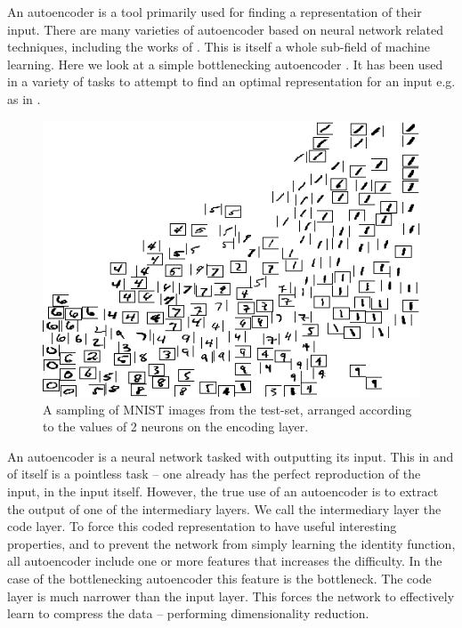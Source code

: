 \documentclass[12pt,parskip]{komatufte}
\begin{document}
An autoencoder is a tool primarily used for finding a representation of their input.
There are many varieties of autoencoder based on neural network related techniques, including the works of \textcite{hinton2002RBM,hinton2006reducing,hinton2006fastDBN,vincent2010stacked,ICML2012Chen_416,2014VAE}.
This is itself a whole sub-field of machine learning.
Here we look at a simple bottlenecking autoencoder
\parencite{bourlard1988auto,japkowicz2000nonlinear}.
It has been used in a variety of tasks to attempt to find an optimal representation for an input e.g. as in .
\begin{figure}
	\caption{A sampling of MNIST images from the test-set, arranged according to the values of 2 neurons on the encoding layer.}
	\label{mnist-encoding}
	\includegraphics[width=\textwidth]{figs/chapterintromachinelearning/mnist-encoding.png}
\end{figure}
An autoencoder is a neural network tasked with outputting its input.
This in and of itself is a pointless task -- one already has the perfect reproduction of the input, in the input itself.
However, the true use of an autoencoder is to extract the output of one of the intermediary layers.
We call the intermediary layer the code layer.
To force this coded representation to have useful interesting properties,
and to prevent the network from simply learning the identity function,
all autoencoder include one or more features that increases the difficulty.
In the case of the bottlenecking autoencoder this feature is the bottleneck.
The code layer is much narrower than the input layer.
This forces the network to effectively learn to compress the data -- performing dimensionality reduction.
\end{document}
